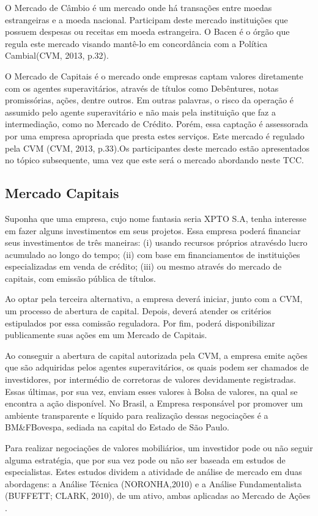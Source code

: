 O Mercado de Câmbio é um mercado onde há transações entre moedas estrangeiras e a moeda nacional. Participam deste mercado instituições que possuem despesas ou receitas em moeda estrangeira. O Bacen é o órgão que regula este mercado visando mantê-lo em concordância com a Política Cambial(CVM, 2013, p.32).

O Mercado de Capitais é o mercado onde empresas captam valores diretamente com os agentes superavitários, através de títulos como Debêntures, notas promissórias, ações, dentre outros. Em outras palavras, o risco da operação é assumido pelo agente superavitário e não mais pela instituição que faz a intermediação, como no Mercado de Crédito. Porém, essa captação é assessorada por uma empresa apropriada que presta estes serviços. Este mercado é regulado pela CVM (CVM, 2013, p.33).Os participantes deste mercado estão apresentados no tópico subsequente, uma vez que este será o mercado abordando neste TCC.

\subsection{Mercado Capitais}

Suponha que uma empresa, cujo nome fantasia seria XPTO S.A, tenha interesse em fazer alguns investimentos em seus projetos. Essa empresa poderá financiar seus investimentos de três maneiras: (i) usando recursos próprios atravésdo lucro acumulado ao longo do tempo; (ii) com base em financiamentos de instituições especializadas em venda de crédito; (iii) ou mesmo através do mercado de capitais, com emissão pública de títulos.
	
Ao optar pela terceira alternativa, a empresa deverá iniciar, junto com a CVM, um processo de abertura de capital. Depois, deverá atender os critérios estipulados por essa comissão reguladora. Por fim, poderá disponibilizar publicamente suas ações  em um Mercado de Capitais. 

Ao conseguir a abertura de capital autorizada pela CVM, a empresa emite ações que são adquiridas pelos agentes superavitários, os quais podem ser chamados de investidores, por intermédio de corretoras de valores devidamente registradas. Essas últimas, por sua vez, enviam esses valores à Bolsa de valores, na qual se encontra a ação disponível. No Brasil, a Empresa responsável por promover um ambiente transparente e líquido para realização dessas negociações é a BM\&FBovespa, sediada na capital do Estado de São Paulo.

Para realizar negociações de valores mobiliários, um investidor pode ou não seguir alguma estratégia, que por sua vez pode ou não ser baseada em estudos de especialistas. Estes estudos dividem a atividade de análise de mercado em duas abordagens: a Análise Técnica (NORONHA,2010) e a Análise Fundamentalista (BUFFETT; CLARK, 2010), de um ativo, ambas aplicadas ao Mercado de Ações .

